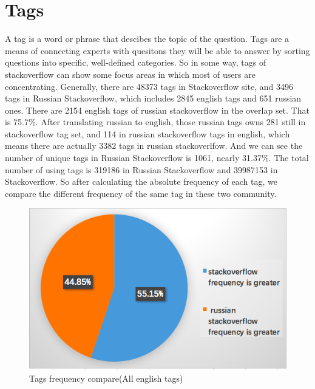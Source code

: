 \documentclass[A4paper,twoside,twocolumn]{article}
\begin{document}
\section{Tags}
A tag is a word or phrase that descibes the topic of the question. Tags are a means of connecting experts with quesitons they will be able to answer by sorting questions into specific, well-defined categories. So in some way, tags of stackoverflow can show some focus areas in which most of users are concentrating.
Generally, there are 48373 tags in Stackoverflow site, and 3496 tags in Russian Stackoverflow, which includes 2845 english tags and 651 russian ones.
There are 2154 english tags of russian stackoverflow in the overlap set. That is 75.7\%.
After translating russian to english, those russian tags owns 281  still in stackoverflow tag set, and 114 in russian stackoverflow tags in english, which means there are actually 3382 tags in russian stackoverlfow. And we can see the number of unique tags in Russian Stackoverflow is 1061, nearly 31.37\%.
The total number of using tags is 319186 in Russian Stackoverflow and 39987153 in Stackoverflow. So after calculating the absolute frequency of each tag, we compare the different frequency of the same tag in these two community.
\begin{figure}[H]
		\includegraphics[width = 0.98\columnwidth]{tag_frequency.png}
		\caption{Tags frequency compare(All english tags)}
	\end{figure}
\end{document}
